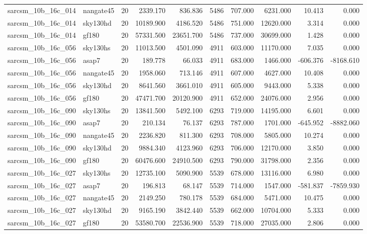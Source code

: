 \documentclass{article}
\begin{document}
\begin{longtable}{llrrrrrrrr}
sarcsm\_10b\_16c\_014 & nangate45 & 20 & 2339.170 & 836.836 & 5486 & 707.000 & 6231.000 & 10.413 & 0.000 \\
sarcsm\_10b\_16c\_014 & sky130hd & 20 & 10189.900 & 4186.520 & 5486 & 751.000 & 12620.000 & 3.314 & 0.000 \\
sarcsm\_10b\_16c\_014 & gf180 & 20 & 57331.500 & 23651.700 & 5486 & 737.000 & 30699.000 & 1.428 & 0.000 \\
sarcsm\_10b\_16c\_056 & sky130hs & 20 & 11013.500 & 4501.090 & 4911 & 603.000 & 11170.000 & 7.035 & 0.000 \\
sarcsm\_10b\_16c\_056 & asap7 & 20 & 189.778 & 66.033 & 4911 & 683.000 & 1466.000 & -606.376 & -8168.610 \\
sarcsm\_10b\_16c\_056 & nangate45 & 20 & 1958.060 & 713.146 & 4911 & 607.000 & 4627.000 & 10.408 & 0.000 \\
sarcsm\_10b\_16c\_056 & sky130hd & 20 & 8641.560 & 3661.010 & 4911 & 605.000 & 9443.000 & 5.338 & 0.000 \\
sarcsm\_10b\_16c\_056 & gf180 & 20 & 47471.700 & 20120.900 & 4911 & 652.000 & 24076.000 & 2.956 & 0.000 \\
sarcsm\_10b\_16c\_090 & sky130hs & 20 & 13841.500 & 5492.100 & 6293 & 719.000 & 14195.000 & 6.601 & 0.000 \\
sarcsm\_10b\_16c\_090 & asap7 & 20 & 210.134 & 76.137 & 6293 & 787.000 & 1701.000 & -645.952 & -8882.060 \\
sarcsm\_10b\_16c\_090 & nangate45 & 20 & 2236.820 & 811.300 & 6293 & 708.000 & 5805.000 & 10.274 & 0.000 \\
sarcsm\_10b\_16c\_090 & sky130hd & 20 & 9884.340 & 4123.960 & 6293 & 706.000 & 12170.000 & 3.850 & 0.000 \\
sarcsm\_10b\_16c\_090 & gf180 & 20 & 60476.600 & 24910.500 & 6293 & 790.000 & 31798.000 & 2.356 & 0.000 \\
sarcsm\_10b\_16c\_027 & sky130hs & 20 & 12735.100 & 5090.900 & 5539 & 678.000 & 13116.000 & 6.980 & 0.000 \\
sarcsm\_10b\_16c\_027 & asap7 & 20 & 196.813 & 68.147 & 5539 & 714.000 & 1547.000 & -581.837 & -7859.930 \\
sarcsm\_10b\_16c\_027 & nangate45 & 20 & 2149.250 & 780.178 & 5539 & 684.000 & 5471.000 & 10.475 & 0.000 \\
sarcsm\_10b\_16c\_027 & sky130hd & 20 & 9165.190 & 3842.440 & 5539 & 662.000 & 10704.000 & 5.333 & 0.000 \\
sarcsm\_10b\_16c\_027 & gf180 & 20 & 53580.700 & 22536.900 & 5539 & 718.000 & 27035.000 & 2.806 & 0.000 \\

\end{longtable}
\end{document}
